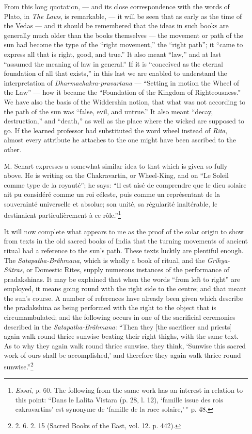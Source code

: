 \documentclass[a4paper, 11pt, oneside, polutonikogreek, english]{article}
\begin{document}
From this long quotation, --- and its close correspondence with the words of Plato, in \emph{The Laws}, is remarkable, --- it will be seen that as early as the time of the Vedas --- and it should be remembered that the ideas in such books are generally much older than the books themselves --- the movement or path of the sun had become the type of the ``right movement,'' the ``right path''; it ``came to express all that is right, good, and true.'' It also meant ``law,'' and at last ``assumed the meaning of law in general.'' If it is ``conceived as the eternal foundation of all that exists,'' in this last we are enabled to understand the interpretation of \emph{Dharmachakra-pravartana} --- ``Setting in motion the Wheel of the Law'' --- how it became the ``Foundation of the Kingdom of Righteousness.'' We have also the basis of the Widdershin notion, that what was not according to the path of the sun was ``false, evil, and untrue.'' It also meant ``decay, destruction,'' and ``death,'' as well as the place where the wicked are supposed to go. If the learned professor had substituted the word wheel instead of \emph{Rita}, almost every attribute he attaches to the one might have been ascribed to the other.

M. Senart expresses a somewhat similar idea to that which is given so fully above. He is writing on the Chakravartin, or Wheel-King, and on ``Le Soleil comme type de la royauté''; he says: ``Il est aisé de comprendre que le dieu solaire ait pu considéré comme un roi céleste, puis comme un représentant de la souverainté universelle et absolue; son unité, sa régularité inaltérable, le destinaient particulièrement à ce rôle.''\footnote{\emph{Essai}, p. 60. The following from the same work has an interest in relation to this point: ``Dans le Lalita Vistara (p. 28, l. 12), `famille issue des rois cakravartins' est synonyme de `famille de la race solaire,'\,'' p. 48.}

It will now complete what appears to me as the proof of the solar origin to show from texts in the old sacred books of India that the turning movements of ancient ritual had a reference to the sun's path. These texts luckily are plentiful enough. The \emph{Satapatha-Brâhmana}, which is wholly a book of ritual, and the \emph{Grihya-Sûtras}, or Domestic Rites, supply numerous instances of the performance of pradakshinas. It may be explained that when the words ``from left to right'' are employed, it means going round with the right side to the centre; and that meant the sun's course. A number of references have already been given which describe the pradakshina as being performed with the right to the object that is circumambulated; and the following occurs in one of the sacrificial ceremonies described in the \emph{Satapatha-Brâhmana}: ``Then they [the sacrificer and priests] again walk round thrice sunwise beating their right thighs, with the same text. As to why they again walk round thrice sunwise, they think, `Sunwise this sacred work of ours shall be accomplished,' and therefore they again walk thrice round sunwise.''\footnote{2. 6. 2. 15 (Sacred Books of the East, vol. 12. p. 442).}
\end{document}
